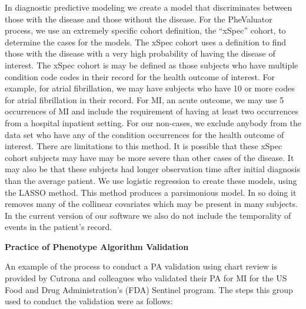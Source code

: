 \documentclass[11pt]{book}
\theoremstyle{definition}
\theoremstyle{definition}
\theoremstyle{definition}
\theoremstyle{remark}
\begin{document}
\begin{enumerate}
  In diagnostic predictive modeling we create a model that discriminates between those with the disease and those without the disease. For the PheValuator process, we use an extremely specific cohort definition, the ``xSpec'' cohort, to determine the cases for the models. The xSpec cohort uses a definition to find those with the disease with a very high probability of having the disease of interest. The xSpec cohort is may be defined as those subjects who have multiple condition code codes in their record for the health outcome of interest. For example, for atrial fibrillation, we may have subjects who have 10 or more codes for atrial fibrillation in their record. For MI, an acute outcome, we may use 5 occurrences of MI and include the requirement of having at least two occurrences from a hospital inpatient setting. For our non-cases, we exclude anybody from the data set who have any of the condition occurrences for the health outcome of interest. There are limitations to this method. It is possible that these xSpec cohort subjects may have may be more severe than other cases of the disease. It may also be that these subjects had longer observation time after initial diagnosis than the average patient. We use logistic regression to create these models, using the LASSO method.\citep{tibshirani_regression_1996} This method produces a parsimonious model. In so doing it removes many of the collinear covariates which may be present in many subjects. In the current version of our software we also do not include the temporality of events in the patient's record.
\end{enumerate}

\textbf{Practice of Phenotype Algorithm Validation}

An example of the process to conduct a PA validation using chart review is provided by Cutrona and colleagues who validated their PA for MI for the US Food and Drug Administration's (FDA) Sentinel program.\citep{cutrona_validation_2013} The steps this group used to conduct the validation were as follows:
\end{document}
